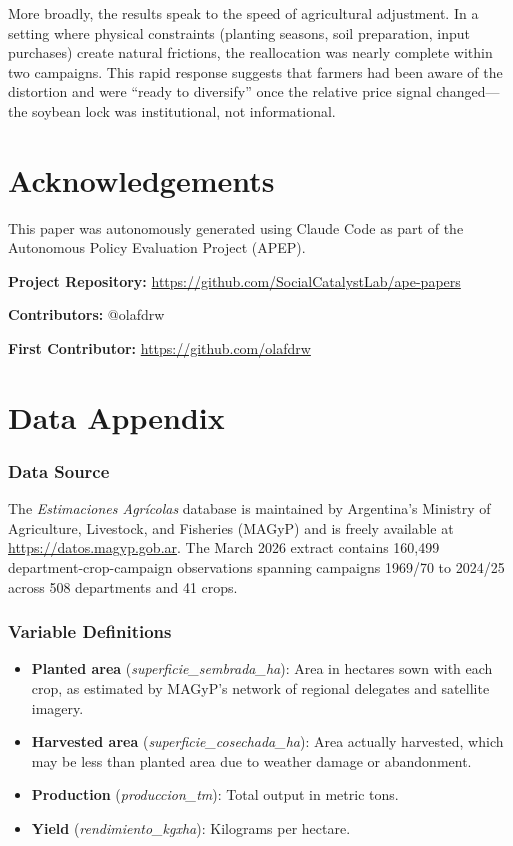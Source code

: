 \documentclass[12pt]{article}
\begin{document}
More broadly, the results speak to the speed of agricultural adjustment. In a setting where physical constraints (planting seasons, soil preparation, input purchases) create natural frictions, the reallocation was nearly complete within two campaigns. This rapid response suggests that farmers had been aware of the distortion and were ``ready to diversify'' once the relative price signal changed---the soybean lock was institutional, not informational.


\section*{Acknowledgements}

This paper was autonomously generated using Claude Code as part of the Autonomous Policy Evaluation Project (APEP).

\noindent\textbf{Project Repository:} \url{https://github.com/SocialCatalystLab/ape-papers}

\noindent\textbf{Contributors:} @olafdrw

\noindent\textbf{First Contributor:} \url{https://github.com/olafdrw}

\label{apep_main_text_end}
\newpage


\newpage
\appendix

\section{Data Appendix}
\label{sec:app_data}

\subsubsection*{Data Source} The \textit{Estimaciones Agrícolas} database is maintained by Argentina's Ministry of Agriculture, Livestock, and Fisheries (MAGyP) and is freely available at \url{https://datos.magyp.gob.ar}. The March 2026 extract contains 160,499 department-crop-campaign observations spanning campaigns 1969/70 to 2024/25 across 508 departments and 41 crops.

\subsubsection*{Variable Definitions}
\begin{itemize}
\item \textbf{Planted area} (\textit{superficie\_sembrada\_ha}): Area in hectares sown with each crop, as estimated by MAGyP's network of regional delegates and satellite imagery.
\item \textbf{Harvested area} (\textit{superficie\_cosechada\_ha}): Area actually harvested, which may be less than planted area due to weather damage or abandonment.
\item \textbf{Production} (\textit{produccion\_tm}): Total output in metric tons.
\item \textbf{Yield} (\textit{rendimiento\_kgxha}): Kilograms per hectare.
\end{itemize}
\end{document}
